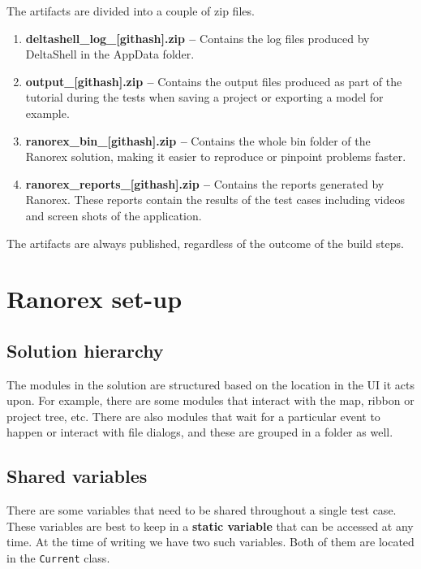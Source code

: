 \documentclass{article}
\newcommand{\inlverb}[1]{\colorbox{cverbbg}{\texttt{#1}}}
\begin{document}
The artifacts are divided into a couple of zip files.

\begin{enumerate}


    \item \textbf{deltashell\_log\_[githash].zip --} 
    Contains the log files produced by DeltaShell in the AppData folder.
    
    \item \textbf{output\_[githash].zip --} 
    Contains the output files produced as part of the tutorial during the tests when saving a project or exporting a model for example.
    
    \item \textbf{ranorex\_bin\_[githash].zip --} 
    Contains the whole bin folder of the Ranorex solution, making it easier to reproduce or pinpoint problems faster. 
    
    \item \textbf{ranorex\_reports\_[githash].zip --} 
    Contains the reports generated by Ranorex. These reports contain the results of the test cases including videos and screen shots of the application. 

\end{enumerate}

The artifacts are always published, regardless of the outcome of the build steps. 

\section{Ranorex set-up}

\subsection{Solution hierarchy}
The modules in the solution are structured based on the location in the UI it acts upon. For example, there are some modules that interact with the map, ribbon or project tree, etc. There are also modules that wait for a particular event to happen or interact with file dialogs, and these are grouped in a folder as well.

\subsection{Shared variables}
There are some variables that need to be shared throughout a single test case. These variables are best to keep in a \textbf{static variable} that can be accessed at any time.
At the time of writing we have two such variables. Both of them are located in the \inlverb{Current} class.
\end{document}
